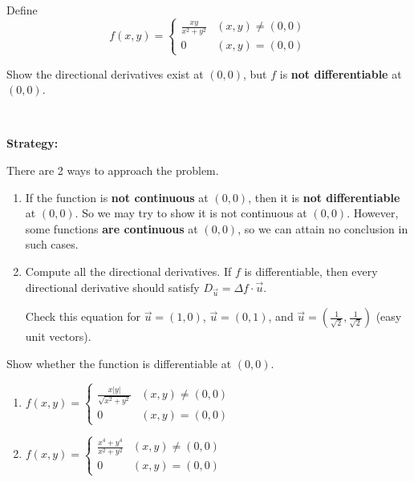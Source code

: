 \documentclass[11pt,fleqn]{book} %
\begin{document}
\begin{exercise}
    Define $$f(x, y) = \begin{cases}
        \frac{xy}{x^2 + y^2} & (x, y) \neq (0, 0) \\
        0                    & (x, y) = (0, 0)
    \end{cases}$$

    Show the directional derivatives exist at $(0, 0)$, but $f$ is \textbf{not differentiable} at $(0, 0)$.

    {~~~}

    \textbf{Strategy:}
    
    There are 2 ways to approach the problem.

    \begin{enumerate}
        \item If the function is \textbf{not continuous} at $(0, 0)$, then it is \textbf{not differentiable} at $(0, 0)$. So we may try to show it is not continuous at $(0, 0)$. However, some functions \textbf{are continuous} at $(0, 0)$, so we can attain no conclusion in such cases.

        \item Compute all the directional derivatives. If $f$ is differentiable, then every directional derivative should satisfy $D_{\vec{u}} = \Delta f \cdot \vec{u}$. 
        
        Check this equation for $\vec{u} = (1, 0)$, $\vec{u} = (0, 1)$, and $\vec{u} = \left( \frac{1}{\sqrt{2}}, \frac{1}{\sqrt{2}} \right)$ (easy unit vectors). 
    \end{enumerate}
\end{exercise}

\begin{exercise}
    Show whether the function is differentiable at $(0, 0)$.

    \begin{enumerate}[label=\alph*)]
        \item $f(x, y) = \begin{cases}
            \frac{x|y|}{\sqrt{x^2 + y^2}} & (x, y) \neq (0, 0) \\
            0                             & (x, y) = (0, 0)
        \end{cases}$

        \item $f(x, y) = \begin{cases}
            \frac{x^4 + y^4}{x^2 + y^2} & (x, y) \neq (0, 0) \\
            0                           & (x, y) = (0, 0)
        \end{cases}$
    \end{enumerate}
\end{exercise}
\end{document}
